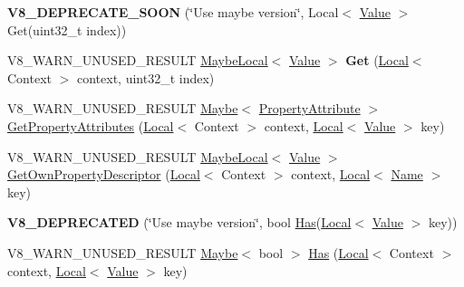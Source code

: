 \begin{DoxyCompactItemize}
\item 
\mbox{\label{classv8_1_1Object_ac27f1b680e53d4c9c879aac3c7380202}} 
{\bfseries V8\+\_\+\+D\+E\+P\+R\+E\+C\+A\+T\+E\+\_\+\+S\+O\+ON} (\char`\"{}Use maybe version\char`\"{}, Local$<$ \mbox{\hyperlink{classv8_1_1Value}{Value}} $>$ Get(uint32\+\_\+t index))
\item 
\mbox{\label{classv8_1_1Object_ac1fcfcfedaf66775c46b53cb1804b949}} 
V8\+\_\+\+W\+A\+R\+N\+\_\+\+U\+N\+U\+S\+E\+D\+\_\+\+R\+E\+S\+U\+LT \mbox{\hyperlink{classv8_1_1MaybeLocal}{Maybe\+Local}}$<$ \mbox{\hyperlink{classv8_1_1Value}{Value}} $>$ {\bfseries Get} (\mbox{\hyperlink{classv8_1_1Local}{Local}}$<$ Context $>$ context, uint32\+\_\+t index)
\item 
V8\+\_\+\+W\+A\+R\+N\+\_\+\+U\+N\+U\+S\+E\+D\+\_\+\+R\+E\+S\+U\+LT \mbox{\hyperlink{classv8_1_1Maybe}{Maybe}}$<$ \mbox{\hyperlink{namespacev8_a05f25f935e108a1ea2d150e274602b87}{Property\+Attribute}} $>$ \mbox{\hyperlink{classv8_1_1Object_ae5c97a596bcb634c50605a574358a9c6}{Get\+Property\+Attributes}} (\mbox{\hyperlink{classv8_1_1Local}{Local}}$<$ Context $>$ context, \mbox{\hyperlink{classv8_1_1Local}{Local}}$<$ \mbox{\hyperlink{classv8_1_1Value}{Value}} $>$ key)
\item 
V8\+\_\+\+W\+A\+R\+N\+\_\+\+U\+N\+U\+S\+E\+D\+\_\+\+R\+E\+S\+U\+LT \mbox{\hyperlink{classv8_1_1MaybeLocal}{Maybe\+Local}}$<$ \mbox{\hyperlink{classv8_1_1Value}{Value}} $>$ \mbox{\hyperlink{classv8_1_1Object_a96c87fe175a5f66b156bb9fa472e480d}{Get\+Own\+Property\+Descriptor}} (\mbox{\hyperlink{classv8_1_1Local}{Local}}$<$ Context $>$ context, \mbox{\hyperlink{classv8_1_1Local}{Local}}$<$ \mbox{\hyperlink{classv8_1_1Name}{Name}} $>$ key)
\item 
\mbox{\label{classv8_1_1Object_a59c9f1b9c165ebce2b6fd93da171a539}} 
{\bfseries V8\+\_\+\+D\+E\+P\+R\+E\+C\+A\+T\+ED} (\char`\"{}Use maybe version\char`\"{}, bool \mbox{\hyperlink{classv8_1_1Object_a57d4819c2cc13715ed22dd23cdc84d7c}{Has}}(\mbox{\hyperlink{classv8_1_1Local}{Local}}$<$ \mbox{\hyperlink{classv8_1_1Value}{Value}} $>$ key))
\item 
V8\+\_\+\+W\+A\+R\+N\+\_\+\+U\+N\+U\+S\+E\+D\+\_\+\+R\+E\+S\+U\+LT \mbox{\hyperlink{classv8_1_1Maybe}{Maybe}}$<$ bool $>$ \mbox{\hyperlink{classv8_1_1Object_a57d4819c2cc13715ed22dd23cdc84d7c}{Has}} (\mbox{\hyperlink{classv8_1_1Local}{Local}}$<$ Context $>$ context, \mbox{\hyperlink{classv8_1_1Local}{Local}}$<$ \mbox{\hyperlink{classv8_1_1Value}{Value}} $>$ key)

\end{DoxyCompactItemize}
